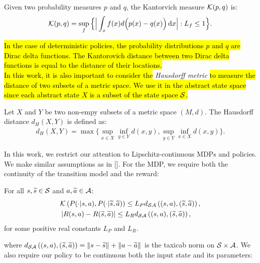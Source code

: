\begin{definition}
Given two probability measures $p$ and $q$, the Kantorvich measure $\mathcal{K}(p, q)$ is:
\begin{align} \mathcal{K}(p, q) = \sup_f\Big\{ \Big| \int_x f(x) d\Big(p(x)-q(x)\Big) \,\mathrm{d} x \Big|: L_f \leq 1 \Big\}. \label{eq:kant}\end{align}
\end{definition}
\noindent \hl{In the case of deterministic policies, the probability distributions $p$ and $q$ are Dirac delta functions. The Kantorovich distance between two Dirac delta functions is equal to the distance of their locations.}\\
\newline
\hl{In this work, it is also important to consider the} \emph{Hausdorff metric} \hl{to measure the distance of two subsets of a metric space. We use it in the abstract state space since each abstract state $X$ is a subset of the state space $\mathcal{S}$.}
\begin{definition}
	Let $X$ and $Y$ be two non-empy subsets of a metric space $(M,d)$. The Hausdorff distance $d_{H}(X,Y)$ is defined as:
	\begin{align}
		d_{H}(X,Y) = \max \Big\{\sup_{x \in X}\inf_{y \in Y}d(x, y), \sup_{y \in Y}\inf_{x \in X}d(x,y)\Big\}.
	\end{align}
\end{definition}
\noindent In this work, we restrict our attention to Lipschitz-continuous MDPs and policies. We make similar assumptions as in [\cite{pirotta2015policy}]. For the MDP, we require both the continuity of the transition model and the reward:
%
\begin{assumption}\label{ass:lipmdp}
	For all $s,\widetilde{s}\in\mathcal{S}$ and $a,\widetilde{a}\in\mathcal{A}$:
	\begin{align}
	&\mathcal{K}\left(P(\cdot|s,a), P(\cdot| \widetilde{s},\widetilde{a})\right) \leq L_{P}d_{\mathcal{S}\mathcal{A}}\left((s,a),(\widetilde{s},\widetilde{a})\right), \label{eq:liptf}\\
	&\left|R(s,a) - R(\widetilde{s},\widetilde{a})\right| \leq L_{R}d_{\mathcal{S}\mathcal{A}}\left((s,a),(\widetilde{s},\widetilde{a})\right),
	\end{align}
	for some positive real constants $L_{P}$ and $L_{R}$.
\end{assumption}
%
\noindent where $d_{\mathcal{S}\mathcal{A}}\left((s,a),(\widetilde{s},\widetilde{a})\right) = \left\|s-\widetilde{s}\right\|_{} + \left\|a-\widetilde{a}\right\|_{}$ is the taxicab norm on $\mathcal{S}\times\mathcal{A}$.
We also require our policy to be continuous both \wrt the input state and its parameters:
